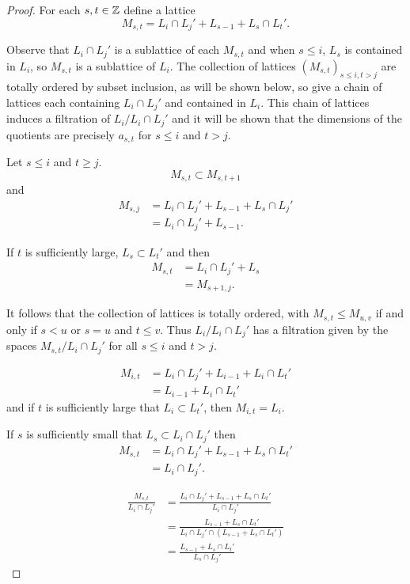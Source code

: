 \documentclass[a4paper, 11pt]{report}
\begin{document}
\begin{proof}
For each $s,t\in\mathbb{Z}$ define a lattice
\begin{equation*}
M_{s,t} = L_i\cap L_j'+ L_{s-1} + L_s\cap L_t'.
\end{equation*}

Observe that $L_i\cap L_j'$ is a sublattice of each $M_{s,t}$ and when $s\le i$, $L_s$ is contained in $L_i$, so $M_{s,t}$ is a sublattice of $L_i$. The collection  of lattices ${(M_{s,t})}_{s\le i, t>j}$ are totally ordered by subset inclusion, as will be shown below, so give a chain of lattices each containing $L_i\cap L_j'$ and contained in $L_i$. This chain of lattices induces a filtration of $L_i/{L_i\cap L_j'}$ and it will be shown that the dimensions of the quotients are precisely $a_{s,t}$ for $s\le i$ and $t>j$.

Let $s\le i$ and $t\geq j$.
\begin{equation*}
M_{s,t}\subset M_{s,t+1}
\end{equation*}
and
\begin{align*}
M_{s,j}
&= L_i\cap L_j' + L_{s-1} +L_s\cap L_j'\\
&= L_i\cap L_j' + L_{s-1}.
\end{align*}

If $t$ is sufficiently large, $L_s\subset L_t'$ and then
\begin{align*}
M_{s,t}
&= L_i\cap L_j' + L_s\\
&= M_{s+1,j}.
\end{align*}

It follows that the collection of lattices is totally ordered, with $M_{s,t}\le M_{u,v}$ if and only if $s<u$ or $s=u$ and $t\le v$. Thus $L_i/{L_i\cap L_j'}$ has a filtration given by the spaces $M_{s,t}/{L_i\cap L_j'}$ for all $s\le i$ and $t>j$.

\begin{align*}
M_{i,t}
&= L_i\cap L_j' + L_{i-1} + L_i\cap L_t'\\
&= L_{i-1} + L_i\cap L_t'
\end{align*}
and if $t$ is sufficiently large that $L_i\subset L_t'$, then $M_{i,t}=L_i$.

If $s$ is sufficiently small that $L_s\subset L_i\cap L_j'$ then
\begin{align*}
M_{s,t}
&= L_i\cap L_j' + L_{s-1} + L_s\cap L_t'\\
&= L_i\cap L_j'.
\end{align*}

\begin{align*}
\frac{M_{s,t}}{L_i\cap L_j'}
&= \frac{L_i\cap L_j' + L_{s-1} + L_s\cap L_t'}{L_i\cap L_j'}\\
&= \frac{L_{s-1} + L_s\cap L_t'}{L_i\cap L_j'\cap(L_{s-1} + L_s\cap L_t')}\\
&= \frac{L_{s-1} + L_s\cap L_t'}{L_s\cap L_j'}
\end{align*}


\end{proof}
\end{document}
